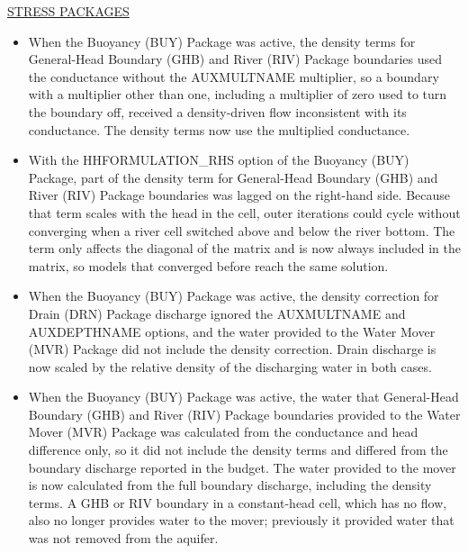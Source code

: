 \underline{STRESS PACKAGES}
\begin{itemize}
\item When the Buoyancy (BUY) Package was active, the density terms for General-Head Boundary (GHB) and River (RIV) Package boundaries used the conductance without the AUXMULTNAME multiplier, so a boundary with a multiplier other than one, including a multiplier of zero used to turn the boundary off, received a density-driven flow inconsistent with its conductance. The density terms now use the multiplied conductance.
\item With the HHFORMULATION\_RHS option of the Buoyancy (BUY) Package, part of the density term for General-Head Boundary (GHB) and River (RIV) Package boundaries was lagged on the right-hand side. Because that term scales with the head in the cell, outer iterations could cycle without converging when a river cell switched above and below the river bottom. The term only affects the diagonal of the matrix and is now always included in the matrix, so models that converged before reach the same solution.
\item When the Buoyancy (BUY) Package was active, the density correction for Drain (DRN) Package discharge ignored the AUXMULTNAME and AUXDEPTHNAME options, and the water provided to the Water Mover (MVR) Package did not include the density correction. Drain discharge is now scaled by the relative density of the discharging water in both cases.
\item When the Buoyancy (BUY) Package was active, the water that General-Head Boundary (GHB) and River (RIV) Package boundaries provided to the Water Mover (MVR) Package was calculated from the conductance and head difference only, so it did not include the density terms and differed from the boundary discharge reported in the budget. The water provided to the mover is now calculated from the full boundary discharge, including the density terms. A GHB or RIV boundary in a constant-head cell, which has no flow, also no longer provides water to the mover; previously it provided water that was not removed from the aquifer.
\end{itemize}

